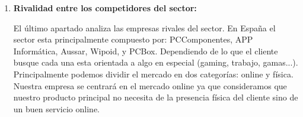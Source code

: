 \begin{enumerate}
    \item \textbf{Rivalidad entre los competidores del sector:}
    
    El último apartado analiza las empresas rivales del sector. En España el sector esta principalmente compuesto por: PCComponentes, APP Informática, Aussar, Wipoid, y PCBox. Dependiendo de lo que el cliente busque cada una esta orientada a algo en especial (gaming, trabajo, gamas...). Principalmente podemos dividir el mercado en dos categorías: online y física. Nuestra empresa se centrará en el mercado online ya que consideramos que nuestro producto principal no necesita de la presencia física del cliente sino de un buen servicio online.

\end{enumerate}